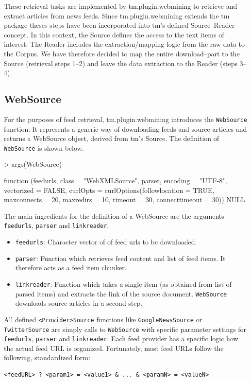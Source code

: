 \documentclass[a4paper]{article}
\let\code=\texttt
\newcommand{\class}[1]{\mbox{\textsf{#1}}}
\newcommand{\pkg}[1]{{\normalfont\fontseries{b}\selectfont #1}}
\newcommand{\fkt}[1]{\code{#1}}
\begin{document}
These retrieval tasks are implemented by \pkg{tm.plugin.webmining} to retrieve and extract articles
from news feeds. Since \pkg{tm.plugin.webmining} extends the \pkg{tm} package theses steps
have been incorporated into \pkg{tm}'s defined \class{Source}--\class{Reader} concept.
In this context, the \class{Source} defines the access to the text items of interest.
The \class{Reader} includes the extraction/mapping logic from the raw data to the \class{Corpus}.
We have therefore decided to map the entire download--part to the \class{Source} (retrieval steps 1--2) and leave the
data extraction to the \class{Reader} (steps 3--4).

\subsection{WebSource}
For the purposes of feed retrieval, \pkg{tm.plugin.webmining} introduces the \fkt{WebSource} function.
It represents a generic way of downloading feeds and source articles and returns a \class{WebSource} object,
derived from \pkg{tm}'s \class{Source}. The definition of \fkt{WebSource} is shown below.
\begin{Schunk}
\begin{Sinput}
> args(WebSource)
\end{Sinput}
\begin{Soutput}
function (feedurls, class = "WebXMLSource", parser, encoding = "UTF-8", 
    vectorized = FALSE, curlOpts = curlOptions(followlocation = TRUE, 
        maxconnects = 20, maxredirs = 10, timeout = 30, connecttimeout = 30)) 
NULL
\end{Soutput}
\end{Schunk}
The main ingredients for the definition of a \class{WebSource} are the arguments \code{feedurls},
\code{parser} and \code{linkreader}. 

\begin{itemize}
\item \code{feedurls}: Character vector of of feed urls to be downloaded.
\item \code{parser}: Function which retrieves feed content and list of feed items. It therefore acts
as a feed item chunker.
\item \code{linkreader}: Function which takes a single item (as obtained from list of parsed items) and
extracts the link of the source document. \fkt{WebSource} downloads source articles in a second step.
\end{itemize}
All defined \fkt{<Provider>Source} functions like \fkt{GoogleNewsSource} or \fkt{TwitterSource} are simply calls to
\fkt{WebSource} with specific parameter settings for \code{feedurls}, \code{parser} and \code{linkreader}.
Each feed provider has a specific logic how the actual feed URL is organized. Fortunately, most feed URLs
follow the following, standardized form:
\begin{center}
\code{<feedURL> ? <param1> = <value1> \& ... \& <paramN> = <valueN>}
\end{center}
\end{document}
